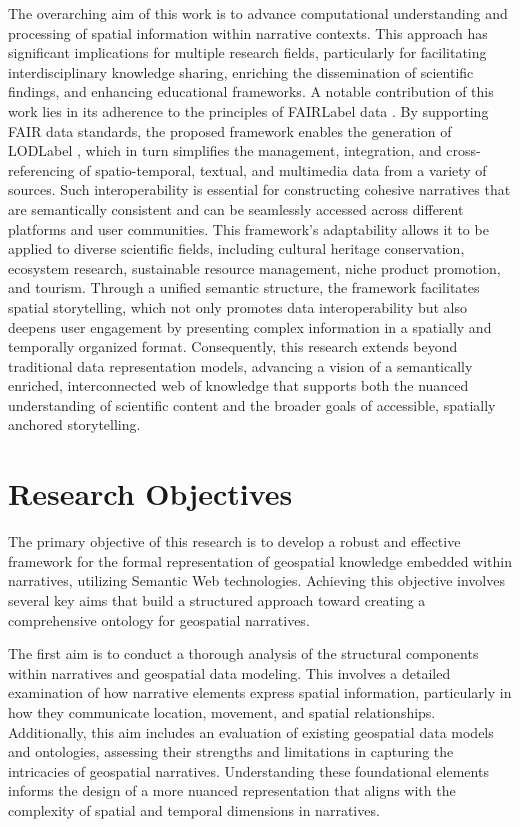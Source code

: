 The overarching aim of this work is to advance computational understanding and processing of spatial information within narrative contexts. This approach has significant implications for multiple research fields, particularly for facilitating interdisciplinary knowledge sharing, enriching the dissemination of scientific findings, and enhancing educational frameworks. A notable contribution of this work lies in its adherence to the principles of \acrfull{FAIRLabel} data \cite{niccolucciDigitalArchaeologyDataCentric2020, wilkinsonAddendumFAIRGuiding2019}. By supporting FAIR data standards, the proposed framework enables the generation of \acrfull{LODLabel} \cite{timberners-leeLinkedDataDesign2006}, which in turn simplifies the management, integration, and cross-referencing of spatio-temporal, textual, and multimedia data from a variety of sources. Such interoperability is essential for constructing cohesive narratives that are semantically consistent and can be seamlessly accessed across different platforms and user communities. This framework's adaptability allows it to be applied to diverse scientific fields, including cultural heritage conservation, ecosystem research, sustainable resource management, niche product promotion, and tourism. Through a unified semantic structure, the framework facilitates spatial storytelling, which not only promotes data interoperability but also deepens user engagement by presenting complex information in a spatially and temporally organized format. Consequently, this research extends beyond traditional data representation models, advancing a vision of a semantically enriched, interconnected web of knowledge that supports both the nuanced understanding of scientific content and the broader goals of accessible, spatially anchored storytelling.

\section{Research Objectives}\label{I-sec:researchObjectives}

The primary objective of this research is to develop a robust and effective framework for the formal representation of geospatial knowledge embedded within narratives, utilizing Semantic Web technologies. Achieving this objective involves several key aims that build a structured approach toward creating a comprehensive ontology for geospatial narratives.


The first aim is to conduct a thorough analysis of the structural components within narratives and geospatial data modeling. This involves a detailed examination of how narrative elements express spatial information, particularly in how they communicate location, movement, and spatial relationships. Additionally, this aim includes an evaluation of existing geospatial data models and ontologies, assessing their strengths and limitations in capturing the intricacies of geospatial narratives. Understanding these foundational elements informs the design of a more nuanced representation that aligns with the complexity of spatial and temporal dimensions in narratives.

